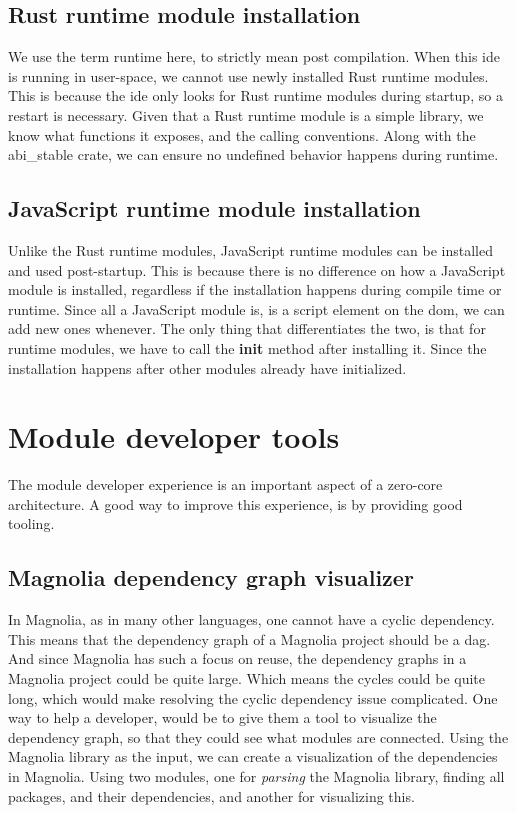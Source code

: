 \subsection{Rust runtime module installation}

We use the term runtime here, to strictly mean post compilation. When this
\gls*{ide} is running in user-space, we cannot use newly installed Rust
runtime modules. This is because the \gls*{ide} only looks for Rust runtime
modules during startup, so a restart is necessary. Given that a Rust runtime
module is a simple library, we know what functions it exposes, and the calling
conventions. Along with the abi\_stable crate, we can ensure no undefined
behavior happens during runtime.

\subsection{JavaScript runtime module installation}

Unlike the Rust runtime modules, JavaScript runtime modules can be installed and
used post-startup. This is because there is no difference on how a JavaScript
module is installed, regardless if the installation happens during compile time
or runtime. Since all a JavaScript module is, is a script element on the
\gls*{dom}, we can add new ones whenever. The only thing that differentiates the
two, is that for runtime modules, we have to call the \textbf{init} method after
installing it. Since the installation happens after other modules already have
initialized.


\section{Module developer tools} \label{sec:mdt}

The module developer experience is an important aspect of a zero-core
architecture. A good way to improve this experience, is by providing good
tooling.

\subsection{Magnolia dependency graph visualizer}

In Magnolia, as in many other languages, one cannot have a cyclic dependency.
This means that the dependency graph of a Magnolia project should be a
\gls*{dag}. And since Magnolia has such a focus on reuse, the dependency graphs
in a Magnolia project could be quite large. Which means the cycles could be
quite long, which would make resolving the cyclic dependency issue complicated.
One way to help a developer, would be to give them a tool to visualize the
dependency graph, so that they could see what modules are connected. Using the
Magnolia library as the input, we can create a visualization of the dependencies
in Magnolia. Using two modules, one for \textit{parsing} the Magnolia library,
finding all packages, and their dependencies, and another for visualizing
this.

